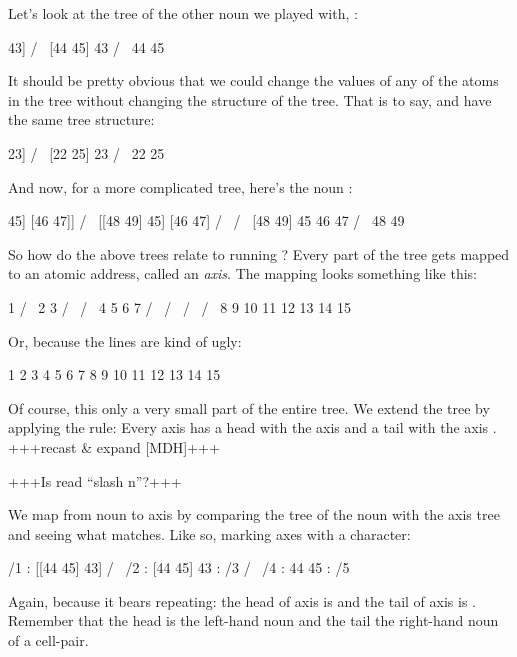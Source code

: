 Let's look at the tree of the other noun we played with, \kode{[[44 45] 43]}:
\begin{code}
 [[44 45] 43]
    /      \
[44 45]    43
 /   \
44   45
\end{code}
It should be pretty obvious that we could change the values of any of the atoms
in the tree without changing the structure of the tree. That is to say, \kode{[[44
45] 43]} and \kode{[[24 25] 23]} have the same tree structure:
\begin{code}
 [[22 25] 23]
    /      \
[22 25]    23
 /   \
22   25
\end{code}
And now, for a more complicated tree, here's the noun \kode{[[[48 49] 45] [46 47]]}:
\begin{code}
  [[[48 49] 45] [46 47]]
       /            \
 [[48 49] 45]      [46 47]
   /       \        /   \
[48 49]    45      46   47
 /   \
48   49
\end{code}
So how do the above trees relate to running ? Every part
of the tree gets mapped to an atomic address, called an \emph{axis}. The mapping
looks something like this:
\begin{code}
           1
       /       \
     2           3
   /   \       /   \
  4     5     6     7
 / \   / \   / \   / \
8   9 10 11 12 13 14 15

\end{code}
Or, because the lines are kind of ugly:
\begin{code}
         1
    2          3
 4    5     6     7
8 9 10 11 12 13 14 15
\end{code}
Of course, this only a very small part of the entire tree. We extend the tree
by applying the rule: Every axis  has a head with the axis and a tail
with the axis \kode{/2n+1}. +++recast \& expand [MDH]+++

+++Is  read ``slash n''?+++

We map from noun to axis by comparing the tree of the noun with the axis tree
and seeing what matches. Like so, marking axes with a \kode{/} character:
\begin{code}
  /1 : [[44 45] 43]
         /        \
 /2 : [44 45]     43 : /3
      /     \
/4 : 44      45 : /5
\end{code}
Again, because it bears repeating: the head of axis  is  and the tail
of axis  is . Remember that the head is the left-hand noun and the
tail the right-hand noun of a cell-pair.

